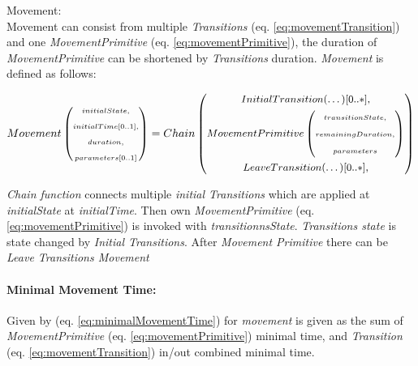     \begin{definition}{Movement:}\label{def:Movement}\\
        Movement can consist from multiple \emph{Transitions} (eq. \ref{eq:movementTransition}) and one \emph{MovementPrimitive} (eq. \ref{eq:movementPrimitive}), the duration of \emph{MovementPrimitive} can be shortened by \emph{Transitions} duration. \emph{Movement} is defined as follows:
        
        \begin{equation}
            \small Movement \left(
                \begin{gathered}
                    \scriptstyle initialState,\\
                    \scriptstyle initialTime[0..1],\\ 
                    \scriptstyle duration,\\ 
                    \scriptstyle parameters[0..1]
                \end{gathered}\right)
            = \small Chain \left(
            \begin{gathered}
            \small InitialTransition(\dots)[0..*],\\
            \small MovementPrimitive\left(
            \begin{gathered}
                \scriptstyle transitionState,\\
                \scriptstyle remainingDuration,\\
                \scriptstyle parameters
            \end{gathered}\right)\\
            \small LeaveTransition(\dots)[0..*],\\
            \end{gathered}
            \right)
        \end{equation}
        
        \emph{Chain function} connects multiple \emph{initial Transitions} which are applied at \emph{initialState} at \emph{initialTime}. Then own \emph{MovementPrimitive} (eq. \ref{eq:movementPrimitive}) is invoked with \emph{transitionnsState}. \emph{Transitions state} is state changed by \emph{Initial Transitions}. After \emph{Movement Primitive} there can be \emph{Leave Transitions Movement}
    \end{definition}

    \paragraph{Minimal Movement Time:} Given by (eq. \ref{eq:minimalMovementTime}) for \emph{movement} is given as the sum of \emph{MovementPrimitive} (eq. \ref{eq:movementPrimitive}) minimal time, and \emph{Transition} (eq. \ref{eq:movementTransition}) in/out combined minimal time.
    
